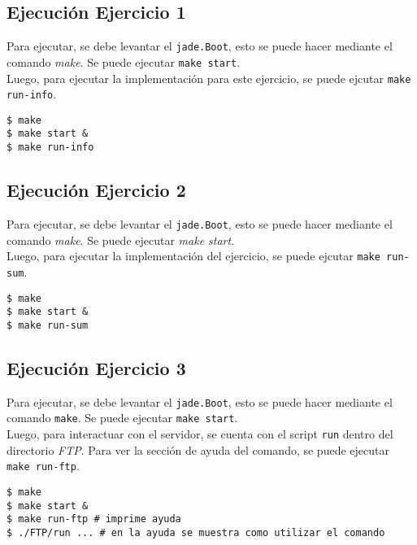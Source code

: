\documentclass[osajnl,twocolumn,showpacs,superscriptaddress,10pt]{revtex4-1} %
\begin{document}
\subsection{Ejecución Ejercicio 1} \label{apendix:ex1}

Para ejecutar, se debe levantar el \texttt{jade.Boot}, esto se puede hacer mediante el comando \textit{make}. Se puede ejecutar \texttt{make start}. \\

Luego, para ejecutar la implementación para este ejercicio,
se puede ejcutar \texttt{make run-info}.

\begin{verbatim}
$ make
$ make start &
$ make run-info
\end{verbatim}

\subsection{Ejecución Ejercicio 2} \label{apendix:ex2}

Para ejecutar, se debe levantar el \texttt{jade.Boot}, esto se puede hacer mediante el comando \textit{make}. Se puede ejecutar \textit{make start}. \\

Luego, para ejecutar la implementación del ejercicio,
se puede ejcutar \texttt{make run-sum}.

\begin{verbatim}
$ make
$ make start &
$ make run-sum
\end{verbatim}

\subsection{Ejecución Ejercicio 3} \label{apendix:ex3}

Para ejecutar, se debe levantar el \texttt{jade.Boot}, esto se puede hacer mediante el comando \texttt{make}. Se puede ejecutar \texttt{make start}. \\

Luego, para interactuar con el servidor, se cuenta con el script \texttt{run} dentro del directorio \textit{FTP}. Para ver la sección de ayuda del comando, se puede ejecutar \texttt{make run-ftp}.

\begin{verbatim}
$ make
$ make start &
$ make run-ftp # imprime ayuda
$ ./FTP/run ... # en la ayuda se muestra como utilizar el comando
\end{verbatim}
\end{document}
